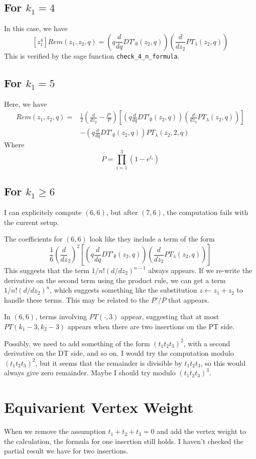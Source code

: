 \documentclass{amsart}
\newcommand{\dd}[1]{\frac{d}{d #1}}
\begin{document}
\subsection{For $k_1=4$}
In this case, we have
\[
  [z_1^4] Rem(z_1, z_2, q) =
  \left(q\dd q DT'_\emptyset(z_2, q)\right)
  \left(\dd{z_2} PT_\lambda(z_2, q)\right)
\]
This is verified by the sage function \texttt{check\_4\_n\_formula}.

\subsection{For $k_1=5$}
Here, we have
\begin{align*}
  [z_1^5] Rem(z_1, z_2, q) =
  &\frac{1}{2}\left(\dd{z_2} - \frac{P'}{P}\right)
  \left[
    \left(q\dd q DT'_\emptyset(z_2, q)\right)
    \left(\dd{z_2} PT_\lambda(z_2, q)\right)
  \right] \\
  &- \left(q\dd q DT'_\emptyset(z_2, q)\right)PT_\lambda(z_2, 2, q)
\end{align*}
Where
\[
  P = \prod_{i=1}^3 (1 - e^{t_i})
\]

\subsection{For $k_1 \geq 6$}
I can explicitely compute $(6,6)$, but after $(7,6)$, the computation
fails with the current setup.

The coefficients for $(6,6)$ look like they include a term of the form
\[
  \frac{1}{6}\left(\dd z_2\right)^2 \left[
    \left(q\dd q DT'_\emptyset(z_2, q)\right)
    \left(\dd{z_2}PT_\lambda(z_2, q)\right)\right]
\]
This suggests that the term $1/n! (d/dz_2)^{n-1}$ always appears.  If
we re-write the derivative on the second term using the product rule,
we can get a term $1/n! (d/dz_2)^{n}$, which suggests something like
the substitution $z \leftarrow z_1 + z_2$ to handle these terms.  This
may be related to the $P'/P$ that appears.

In $(6,6)$, terms involving $PT(\cdot, 3)$ appear, suggesting that at
most $PT(k_1-3, k_2-3)$ appears when there are two insertions on the
PT side.

Possibly, we need to add something of the form $(t_1t_2t_3)^2$, with a
second derivative on the DT side, and so on.  I would try the
computation modulo $(t_1t_2t_3)^2$, but it seems that the remainder is
divisible by $t_1t_2t_3$, so this would always give zero remainder.
Maybe I should try modulo $(t_1t_2t_3)^3$.

\section{Equivarient Vertex Weight}
When we remove the assumption $t_1 + t_2 + t_3 = 0$ and add the vertex
weight to the calculation, the formula for one insertion still holds.
I haven't checked the partial result we have for two insertions.
\end{document}
